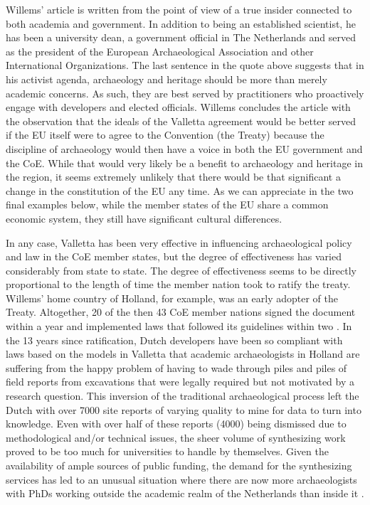 Willems’ article is written from the point of view of a true insider connected to both academia and government. In addition to being an established scientist, he has been a university dean, a government official in The Netherlands and served as the president of the European Archaeological Association and other International Organizations. The last sentence in the quote above suggests that in his activist agenda, archaeology and heritage should be more than merely academic concerns. As such, they are best served by practitioners who proactively engage with developers and elected officials. Willems concludes the article with the observation that the ideals of the Valletta agreement would be better served if the EU itself were to agree to the Convention (the Treaty) because the discipline of archaeology would then have a voice in both the EU government and the CoE. While that would very likely be a benefit to archaeology and heritage in the region, it seems extremely unlikely that there would be that significant a change in the constitution of the EU any time. As we can appreciate in the two final examples below, while the member states of the EU share a common economic system, they still have significant cultural differences.  


In any case, Valletta has been very effective in influencing archaeological policy and law in the CoE member states, but the degree of effectiveness has varied considerably from state to state. The degree of effectiveness seems to be directly proportional to the length of time the member nation took to ratify the treaty. Willems’ home country of Holland, for example, was an early adopter of the Treaty. Altogether, 20 of the then 43 CoE member nations signed the document within a year and implemented laws that followed its guidelines within two \parencite[58]{Willems_2007}. 
In the 13 years since ratification, Dutch developers have been so compliant with laws based on the models in Valletta that academic archaeologists in Holland are suffering from the happy problem of having to wade through piles and piles of field reports from excavations that were legally required but not motivated by a research question. This inversion of the traditional archaeological process left the Dutch with over \num{7000} site reports of varying quality to mine for data to turn into knowledge. Even with over half of these reports (\num{4000}) being dismissed due to methodological and/or technical issues, the sheer volume of synthesizing work proved to be too much for universities to handle by themselves. 
Given the availability of ample sources of public funding, the demand for the synthesizing services has led to an unusual situation where there are now more archaeologists with PhDs working outside the academic realm of the Netherlands than inside it \parencite[93]{Groenewoudt_2014}.  

